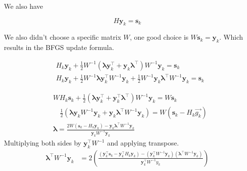 \documentclass[12pt]{report}
\begin{document}
We also have

$$
	H{\bm{y}_k}=\bm{s}_{k}
$$


We also didn't choose a specific matrix $W$, one good choice is $W \bm{s}_{k}=\bm{y}_k$. Which results in the BFGS update formula.


$$
	\begin{aligned}
		 & H_{k} \bm{y}_k+\frac{1}{2} W^{-1}\left(\bm{\lambda} \bm{y}_{k}^{\top}+\bm{y}_{k} \bm{\lambda}^{\top}\right) W^{-1} \bm{y}_{k}=\bm{s}_{k}                           \\
		 & H_{k} \bm{y}_k+\frac{1}{2} W^{-1} \bm{\lambda} \bm{y}_{k}^{\top} W^{-1} \bm{y}_{k}+\frac{1}{2} W^{-1} \bm{y}_{k} \bm{\lambda}^{\top} W^{-1} \bm{y}_{k} =\bm{s}_{k}
	\end{aligned}
$$

$$
	\begin{aligned}
		 & W H_{k} \bm{s}_{k}+\frac{1}{2}\left(\bm{\lambda} \bm{y}_k^{\top}+\bm{y}_{k}^{\top} \bm{\lambda}^{\top}\right) W^{-1} \bm{y}_{k}=W \bm{s}_{k}                                 \\
		 & \quad \frac{1}{2}\left(\bm{\lambda} \bm{y}_k W^{-1} \bm{y}_{k}+\bm{y}_{k} \bm{\lambda}^{\top} W^{-1} \bm{y}_{k}\right)=W\left(\bm{s}_{k}-H_{k} \overrightarrow{g_{k}}\right) \\
		 & \bm{\lambda}=\frac{2 W\left(\bm{s}_{k}-H_{k} \bm{y}_k\right)-\bm{y}_{k} \bm{\lambda}^{\top} W^{-1} \bm{y}_{k}}{\bm{y}_{k} W^{-1} {\bm y_{k}}}
	\end{aligned}
$$
Multiplying both sides by $\bm{y}_k^{\top} W^{-1}$ and applying transpose.
$$
	\begin{aligned}
		\bm{\lambda}^{\top} W^{-1} \bm{y}_k & =
		2\left(\frac{(\bm{y}_{k}^{\top} \bm{s}_k
		-\bm y_{k}^{\top}H_k \bm y_{k})
		- \left(\bm{y}_{k}^{\top} W^{-1} \bm{y}_{k}\right)
		\left(\bm{\lambda}^{\top} W^{-1} \bm{y}_{k}\right)}{\bm{y}_k^{\top} W^{-1} y_{k}                                                                                                          }\right) \\
	\end{aligned}
$$
\end{document}
